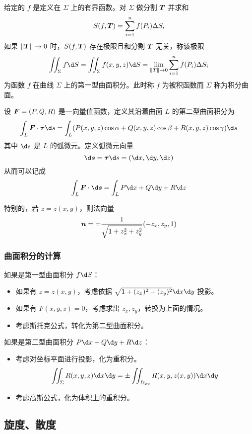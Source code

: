\begin{definition}[第一型曲面积分]
	给定的 $f$ 是定义在 $\Sigma$ 上的有界函数。对 $\Sigma$ 做分割 $\boldsymbol{T}$ 并求和
	\[ S(f, \boldsymbol{T}) = \sum_{i=1}^{n} f(P_i)\Delta S_i \]
	如果 $\|\boldsymbol{T}\| \to 0$ 时，$S(f, \boldsymbol{T})$ 存在极限且和分割 $\boldsymbol{T}$ 无关，称该极限
	\[ \iint_\Sigma f \d S = \iint_{\Sigma} f(x, y, z) \d S = \lim_{\|T\| \to 0} \sum_{i=1}^{n} f(P_i) \Delta S_i \]
	为函数 $f$ 在曲线 $\Sigma$ 上的第一型曲面积分。此时称 $f$ 为被积函数而 $\Sigma$ 称为积分曲面。
\end{definition}

\begin{definition}[第二型曲面积分]
	设 $\boldsymbol{F} = (P, Q, R)$ 是一向量值函数，定义其沿着曲面 $L$ 的第二型曲面积分为
	\[ \int_L \vbf{F} \cdot \vbf{\tau} \d s = \int_L (P(x,y,z) \cos \alpha + Q(x, y, z) \cos \beta + R(x, y, z) \cos \gamma) \d s \]
	其中 $\d s$ 是 $L$ 的弧微元。定义弧微元向量
	\[ \d \vbf{s} = \vbf{\tau} \d s = (\d x, \d y, \d z) \]
	从而可以记成
	\[ \int_L \vbf{F} \cdot \d \vbf{s} = \int_L P \d x + Q \d y + R \d z \]
\end{definition}


特别的，若 $z = z(x, y)$，则法向量
\[ \boldsymbol{n} = \pm \frac{1}{\sqrt{1 + z_x^2 + z_y^2}} (-z_x, z_y, 1) \]

\subsubsection*{曲面积分的计算}

如果是第一型曲面积分 $f \d S$：
\begin{itemize}
	\item 如果有 $z = z(x, y)$，考虑依据 $\sqrt{1 + (z_x)^2 + (z_y)^2} \d x \d y$ 投影。
	\item 如果有 $F(x, y, z) = 0$，考虑求出 $z_x, z_y$，转换为上面的情况。
	\item 考虑斯托克公式，转化为第二型曲面积分。
\end{itemize}

如果是第二型曲面积分 $P \d x + Q \d y + R \d z$：
\begin{itemize}
	\item 考虑对坐标平面进行投影，化为重积分。
	\[ \iint_{\Sigma} R(x, y, z) \d x \d y = \pm \iint_{D_{xy}} R(x, y, z(x, y)) \d x \d y \]
	\item 考虑高斯公式，化为体积上的重积分。
\end{itemize}

\subsection{旋度、散度}

